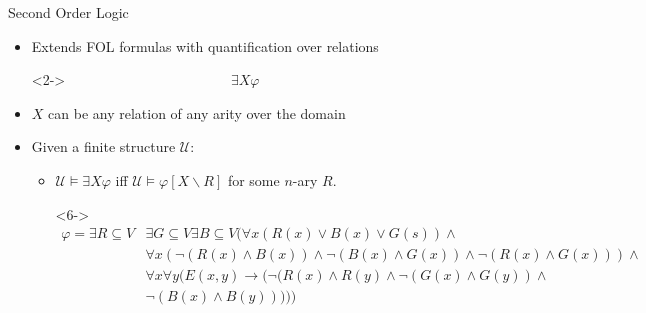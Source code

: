 \documentclass[usenames,dvipsnames]{beamer}
\newcommand{\cU}{\mathcal{U}}
\begin{document}
\begin{frame}{Second Order Logic}
    \begin{itemize}
        \item<1-> Extends FOL formulas with quantification over relations
        \item[]<2-> ~~~~~~~~~~~~~~~~~~~~~~~$\exists X\varphi$
        \item[] 
        \item<3-> $X$ can be any relation of any arity over the domain
        \item<4-> Given a finite structure $\cU$:
        \begin{itemize}
            \item<5-> $\cU\vDash\exists X\varphi$ iff $\cU\vDash\varphi[X\backslash R]$ for some $n$-ary $R$.
            \item[]<6-> \begin{align*}
                \varphi =  \exists R\subseteq V&\exists G\subseteq V\exists B\subseteq V (\forall x (R(x)\vee B(x)\vee G(s))\wedge\\
                                                &\forall x (\neg (R(x)\wedge B(x))\wedge\neg(B(x)\wedge G(x))\wedge\neg(R(x)\wedge G(x)))\wedge\\
                                                &\forall x\forall y(E(x,y)\rightarrow(\neg(R(x)\wedge R(y)\wedge\neg(G(x)\wedge G(y))\wedge\\
                                                                                        &\neg(B(x)\wedge B(y)))))
                \end{align*}
        \end{itemize}
    \end{itemize}
\end{frame}
\end{document}
